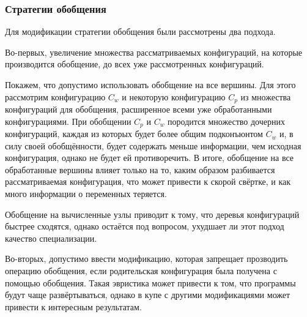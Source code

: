 
\subsubsection{Стратегии обобщения}

Для модификации стратегии обобщения были рассмотрены два подхода.


Во-первых, увеличение множества рассматриваемых конфигураций, на которые
производится обобщение, до всех уже рассмотренных конфигураций.

Покажем, что допустимо использовать обобщение на все вершины.
Для этого рассмотрим конфигурацию $C_w$ и некоторую конфигурацию $C_p$ из множества
конфигураций для обобщения, расширенное всеми уже обработанными конфигурациями.
При обобщении $C_p$ и $C_w$ породится множество дочерних конфигураций, %
каждая из которых будет более общим подконъюнтом $C_w$ и, в силу своей
обобщённости, будет содержать меньше информации, чем исходная конфигурация,
однако не будет ей противоречить. В итоге, обобщение на все обработанные
вершины влияет только на то, каким образом разбивается рассматриваемая
конфигурация, что может привести к скорой свёртке, и как много информации о
переменных теряется.


Обобщение на вычисленные узлы приводит к тому, что деревья конфигураций
быстрее сходятся, однако остаётся под вопросом, ухудшает ли этот подход
качество специализации.

Во-вторых, допустимо ввести модификацию, которая запрещает прозводить операцию
обобщения, если родительская конфигурация была получена с помощью обобщения.
Такая эвристика может привести к том, что программы будут чаще развёртываться,
однако в купе с другими модификациями может привести к интересным результатам.

